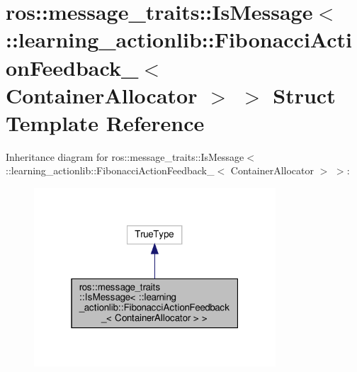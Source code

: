 \hypertarget{structros_1_1message__traits_1_1IsMessage_3_01_1_1learning__actionlib_1_1FibonacciActionFeedback6192661380528265df5c7a51cd0f640b}{}\section{ros\+:\+:message\+\_\+traits\+:\+:Is\+Message$<$ \+:\+:learning\+\_\+actionlib\+:\+:Fibonacci\+Action\+Feedback\+\_\+$<$ Container\+Allocator $>$ $>$ Struct Template Reference}
\label{structros_1_1message__traits_1_1IsMessage_3_01_1_1learning__actionlib_1_1FibonacciActionFeedback6192661380528265df5c7a51cd0f640b}


Inheritance diagram for ros\+:\+:message\+\_\+traits\+:\+:Is\+Message$<$ \+:\+:learning\+\_\+actionlib\+:\+:Fibonacci\+Action\+Feedback\+\_\+$<$ Container\+Allocator $>$ $>$\+:
\nopagebreak
\begin{figure}[H]
\begin{center}
\leavevmode
\includegraphics[width=256pt]{structros_1_1message__traits_1_1IsMessage_3_01_1_1learning__actionlib_1_1FibonacciActionFeedbackc3186e85db718b9a220d8898d60790cc}
\end{center}
\end{figure}


